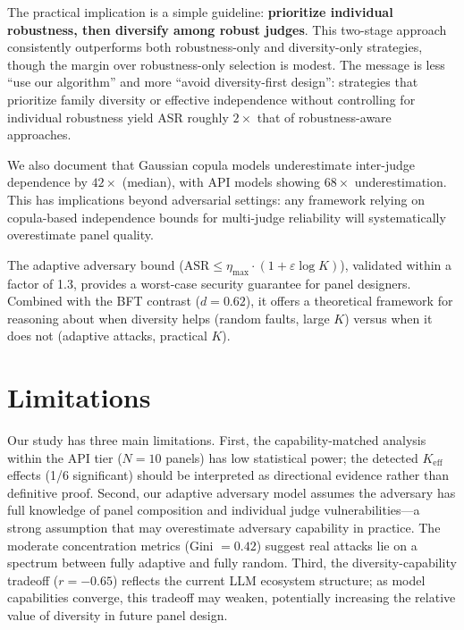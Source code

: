 \documentclass[11pt,a4paper]{article}
\begin{document}
The practical implication is a simple guideline: \textbf{prioritize individual robustness, then diversify among robust judges}. This two-stage approach consistently outperforms both robustness-only and diversity-only strategies, though the margin over robustness-only selection is modest. The message is less ``use our algorithm'' and more ``avoid diversity-first design'': strategies that prioritize family diversity or effective independence without controlling for individual robustness yield ASR roughly $2\times$ that of robustness-aware approaches.

We also document that Gaussian copula models underestimate inter-judge dependence by $42\times$ (median), with API models showing $68\times$ underestimation. This has implications beyond adversarial settings: any framework relying on copula-based independence bounds for multi-judge reliability will systematically overestimate panel quality.

The adaptive adversary bound ($\text{ASR} \leq \eta_{\max} \cdot (1 + \varepsilon \log K)$), validated within a factor of 1.3, provides a worst-case security guarantee for panel designers. Combined with the BFT contrast ($d = 0.62$), it offers a theoretical framework for reasoning about when diversity helps (random faults, large $K$) versus when it does not (adaptive attacks, practical $K$).

\section*{Limitations}

Our study has three main limitations. First, the capability-matched analysis within the API tier ($N = 10$ panels) has low statistical power; the detected $K_{\text{eff}}$ effects (1/6 significant) should be interpreted as directional evidence rather than definitive proof. Second, our adaptive adversary model assumes the adversary has full knowledge of panel composition and individual judge vulnerabilities---a strong assumption that may overestimate adversary capability in practice. The moderate concentration metrics (Gini $= 0.42$) suggest real attacks lie on a spectrum between fully adaptive and fully random. Third, the diversity-capability tradeoff ($r = -0.65$) reflects the current LLM ecosystem structure; as model capabilities converge, this tradeoff may weaken, potentially increasing the relative value of diversity in future panel design.



\end{document}
